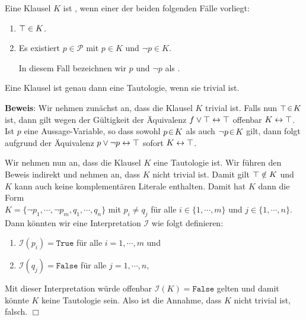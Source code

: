 \begin{Definition}
  Eine Klausel $K$ ist , wenn einer der beiden folgenden Fälle vorliegt:
  \begin{enumerate}
  \item $\top \in K$.
  \item Es existiert $p \in \mathcal{P}$ mit $p \in K$ und $\neg p \in K$.

        In diesem Fall bezeichnen wir $p$ und $\neg p$ als .
        \eox
\end{enumerate}
\end{Definition}

\begin{Satz} \label{satz:trivial}
  Eine Klausel ist genau dann eine Tautologie, wenn sie trivial ist.
\end{Satz}
\textbf{Beweis}:  Wir nehmen zunächst an, dass die Klausel $K$ trivial ist.
Falls nun $\top \!\in\! K$ ist, dann gilt wegen der Gültigkeit der Äquivalenz 
$f \vee \top \leftrightarrow \top$
offenbar $K \leftrightarrow \top$.   Ist $p$ eine Aussage-Variable, so dass
sowohl $p \!\in\! K$ als auch $\neg p \!\in\! K$ gilt, dann folgt aufgrund der Äquivalenz $p \vee
\neg p \leftrightarrow \top$ sofort $K \leftrightarrow \top$.

Wir nehmen nun an, dass die Klausel $K$ eine Tautologie ist.  Wir führen den Beweis
indirekt und nehmen an, dass $K$ nicht trivial ist.  Damit gilt  $\top \notin K$ und
$K$ kann auch keine komplementären Literale enthalten.  Damit hat $K$ dann die Form
\\[0.2cm]
\hspace*{1.3cm} 
$K = \{ \neg p_1, \cdots, \neg p_m, q_1, \cdots, q_n \}$ \quad mit $p_i
\not= q_j$ für alle $i \in \{ 1,\cdots,m\}$ und $j \in \{1, \cdots, n\}$.
\\[0.2cm]
Dann könnten wir eine Interpretation $\mathcal{I}$ wie folgt definieren:
\begin{enumerate}
\item $\mathcal{I}(p_i) = \texttt{True}$ für alle $i = 1, \cdots, m$ und
\item $\mathcal{I}(q_j) = \texttt{False}$ für alle $j = 1, \cdots, n$,
\end{enumerate}
Mit dieser Interpretation würde offenbar $\mathcal{I}(K) = \texttt{False}$ gelten und damit könnte $K$ keine
Tautologie sein.  Also ist die Annahme, dass $K$ nicht trivial ist, falsch.
\hspace*{\fill}  $\Box$

